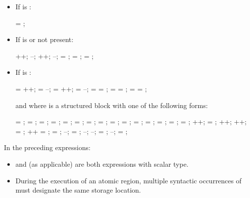 \begin{ccppspecific}
\begin{itemize}
\item If  is :
\begin{ompSyntax}
 = ;
\end{ompSyntax}

\item If  is  or not present:
\begin{ompSyntax}
++;
--;
++;
--;
 = ;
 =   ;
 =   ;
\end{ompSyntax}

\item If  is :
\begin{ompSyntax}
 = ++;
 = --;
 = ++;
 = --;
 =  = ;
 =  =   ;
 =  =   ;
\end{ompSyntax}

and where  is a structured block with one of the following forms:

\begin{ompSyntax}
{  = ;  = ; }
{  = ;  = ; }
{  = ;  =   ; }
{  = ;  =   ; }
{  =   ;  = ; }
{  =   ;  = ; }
{  = ;  = ; }
{  = ; ++; }
{  = ; ++; }
{ ++;  = ; }
{ ++\code{;}  = ; }
{  = ; --; }
{  = ; --; }
{ --;  = ; }
{ --;  = ; }
\end{ompSyntax}
\end{itemize}

In the preceding expressions:

\begin{itemize}
\item {} and  (as applicable) are both  expressions with scalar type.

\item During the execution of an atomic region, multiple syntactic occurrences of  must
designate the same storage location.


\end{itemize}
\end{ccppspecific}
